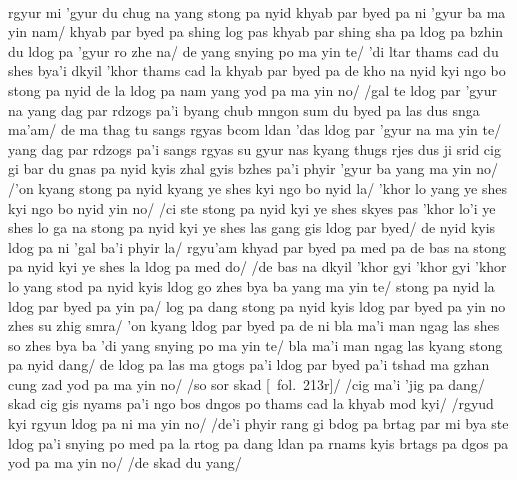 \documentclass[12pt]{article}
\begin{document}
\textbf{\TVA}\\
rgyur mi 'gyur du chug na yang stong pa nyid khyab par byed pa ni 'gyur ba ma yin nam/ khyab par byed pa shing log pas khyab par shing sha pa ldog pa bzhin du ldog pa 'gyur ro zhe na/ de yang snying po ma yin te/ 'di ltar thams cad du shes bya'i dkyil 'khor thams cad la khyab par byed pa de kho na nyid kyi ngo bo stong pa nyid de la ldog pa nam yang yod pa ma yin no/ /gal te ldog par 'gyur na yang dag par rdzogs pa'i byang chub mngon sum du byed pa las dus snga ma'am/ de ma thag tu sangs rgyas bcom ldan 'das ldog par 'gyur na ma yin te/ yang dag par rdzogs pa'i sangs rgyas su gyur nas kyang thugs rjes dus ji srid cig gi bar du gnas pa nyid kyis zhal gyis bzhes pa'i phyir 'gyur ba yang ma yin no/ /'on kyang stong pa nyid kyang ye shes kyi ngo bo nyid la/ 'khor lo yang ye shes kyi ngo bo nyid yin no/ /ci ste stong pa nyid kyi ye shes skyes pas 'khor lo'i ye shes lo ga na stong pa nyid kyi ye shes las gang gis ldog par byed/ de nyid kyis ldog pa ni 'gal ba'i phyir la/ rgyu'am khyad par byed pa med pa de bas na stong pa nyid kyi ye shes la ldog pa med do/ /de bas na dkyil 'khor gyi 'khor gyi 'khor lo yang stod pa nyid kyis ldog go zhes bya ba yang ma yin te/ stong pa nyid la ldog par byed pa yin pa/ log pa dang stong pa nyid kyis ldog par byed pa yin no zhes su zhig smra/ 'on kyang ldog par byed pa de ni bla ma'i man ngag las shes so zhes bya ba 'di yang snying po ma yin te/ bla ma'i man ngag las kyang stong pa nyid dang/ de ldog pa las ma gtogs pa'i ldog par byed pa'i tshad ma gzhan cung zad yod pa ma yin no/ /so sor skad [\TVA\ fol.\ 213r]/ /cig ma'i 'jig pa dang/ skad cig gis nyams pa'i ngo bos dngos po thams cad la khyab mod kyi/ /rgyud kyi rgyun ldog pa ni ma yin no/ /de'i phyir rang gi bdog pa brtag par mi bya ste ldog pa'i snying po med pa la rtog pa dang ldan pa rnams kyis brtags pa dgos pa yod pa ma yin no/ /de skad du yang/ \\
\end{document}
